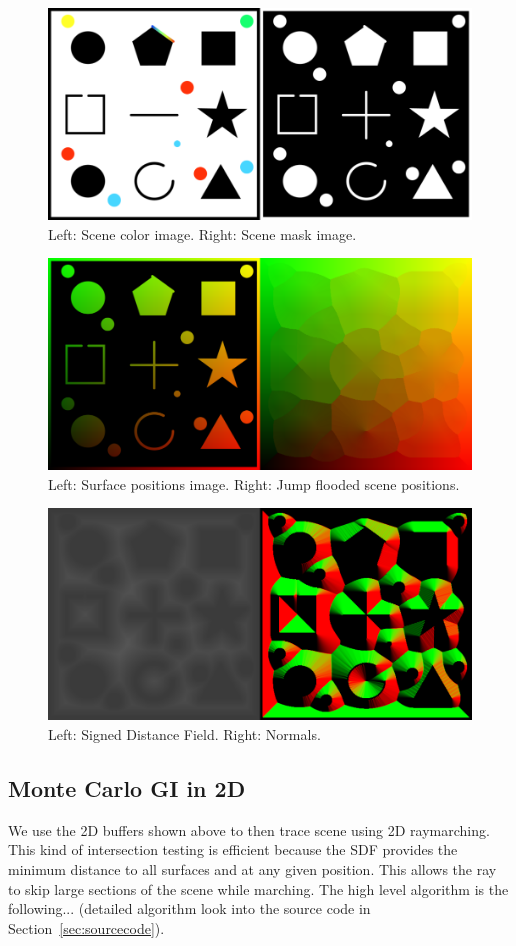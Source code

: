 \documentclass[acmtog, nonacm]{acmart}
\begin{document}
\begin{figure}[ht]
  \centering
    \includegraphics[width=0.7\linewidth]{scene_description.png}
    \caption{Left: Scene color image. Right: Scene mask image.}
\end{figure}

\begin{figure}[ht]
  \centering
    \includegraphics[width=0.7\linewidth]{jfa.png}
    \caption{Left: Surface positions image. Right: Jump flooded scene positions.}
\end{figure}

\begin{figure}[ht]
  \centering
    \includegraphics[width=0.7\linewidth]{sdf_norm.png}
    \caption{Left: Signed Distance Field. Right: Normals.}
\end{figure}



\subsection{Monte Carlo GI in 2D}
We use the 2D buffers shown above to then trace scene using 2D raymarching. This kind of intersection testing is efficient because the SDF provides the minimum distance to all surfaces and at any given position. This allows the ray to skip large sections of the scene while marching. The high level algorithm is the following... (detailed algorithm look into the source code in Section~\ref{sec:sourcecode}).
\end{document}
